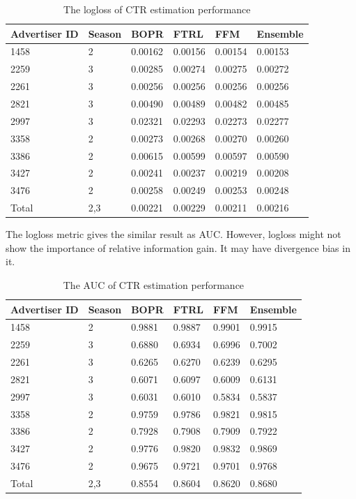 \begin{table}[H]
\caption{The logloss of CTR estimation performance}
\label{tab:CTR AUC}
\begin{center}
\begin{tabular}{ l l l l l l } 
\hline
Advertiser ID & Season & BOPR & FTRL & FFM & Ensemble \\
\hline
1458 & 2 & 0.00162 & 0.00156 & 0.00154 & 0.00153 \\
2259 & 3 & 0.00285 & 0.00274 & 0.00275 & 0.00272 \\
2261 & 3 & 0.00256 & 0.00256 & 0.00256 & 0.00256 \\
2821 & 3 & 0.00490 & 0.00489 & 0.00482 & 0.00485 \\
2997 & 3 & 0.02321 & 0.02293 & 0.02273 & 0.02277 \\
3358 & 2 & 0.00273 & 0.00268 & 0.00270 & 0.00260 \\
3386 & 2 & 0.00615 & 0.00599 & 0.00597 & 0.00590 \\
3427 & 2 & 0.00241 & 0.00237 & 0.00219 & 0.00208 \\
3476 & 2 & 0.00258 & 0.00249 & 0.00253 & 0.00248 \\
Total & 2,3 & 0.00221 & 0.00229 & 0.00211 & 0.00216 \\
\hline
\end{tabular}
\end{center}
\end {table}

The logloss metric gives the similar result as AUC. However, logloss might not show the importance of relative information gain. It may have divergence bias in it.

\begin{table}[H]
\caption{The AUC of CTR estimation performance}
\label{tab:CTR AUC}
\begin{center}
\begin{tabular}{ l l l l l l } 
\hline
Advertiser ID & Season & BOPR & FTRL & FFM & Ensemble \\
\hline
1458 & 2 & 0.9881 & 0.9887 & 0.9901 & 0.9915 \\
2259 & 3 & 0.6880 & 0.6934 & 0.6996 & 0.7002 \\
2261 & 3 & 0.6265 & 0.6270 & 0.6239 & 0.6295 \\
2821 & 3 & 0.6071 & 0.6097 & 0.6009 & 0.6131 \\
2997 & 3 & 0.6031 & 0.6010 & 0.5834 & 0.5837 \\
3358 & 2 & 0.9759 & 0.9786 & 0.9821 & 0.9815 \\
3386 & 2 & 0.7928 & 0.7908 & 0.7909 & 0.7922 \\
3427 & 2 & 0.9776 & 0.9820 & 0.9832 & 0.9869 \\
3476 & 2 & 0.9675 & 0.9721 & 0.9701 & 0.9768 \\
Total & 2,3 & 0.8554 & 0.8604 & 0.8620 & 0.8680 \\
\hline
\end{tabular}
\end{center}
\end {table}

